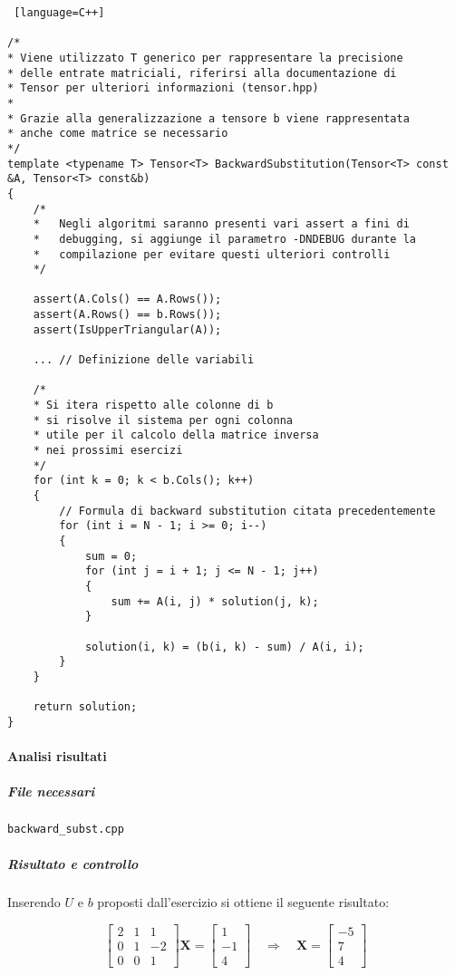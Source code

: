 \begin{lstlisting} [language=C++]

/*
* Viene utilizzato T generico per rappresentare la precisione 
* delle entrate matriciali, riferirsi alla documentazione di 
* Tensor per ulteriori informazioni (tensor.hpp)
*
* Grazie alla generalizzazione a tensore b viene rappresentata 
* anche come matrice se necessario
*/
template <typename T> Tensor<T> BackwardSubstitution(Tensor<T> const &A, Tensor<T> const&b)
{
    /*
    *   Negli algoritmi saranno presenti vari assert a fini di 
    *   debugging, si aggiunge il parametro -DNDEBUG durante la 
    *   compilazione per evitare questi ulteriori controlli
    */

    assert(A.Cols() == A.Rows());
    assert(A.Rows() == b.Rows());
    assert(IsUpperTriangular(A));

    ... // Definizione delle variabili

    /* 
    * Si itera rispetto alle colonne di b 
    * si risolve il sistema per ogni colonna
    * utile per il calcolo della matrice inversa
    * nei prossimi esercizi
    */
    for (int k = 0; k < b.Cols(); k++)
    {
        // Formula di backward substitution citata precedentemente
        for (int i = N - 1; i >= 0; i--)
        {
            sum = 0;
            for (int j = i + 1; j <= N - 1; j++)
            {
                sum += A(i, j) * solution(j, k);
            }

            solution(i, k) = (b(i, k) - sum) / A(i, i);
        }
    }

    return solution;
}

\end{lstlisting}

\paragraph{Analisi risultati}

\subparagraph{File necessari} \texttt{backward\_subst.cpp}

\subparagraph{Risultato e controllo}

Inserendo $U$ e $b$ proposti dall'esercizio si ottiene il seguente risultato:

$$
	\begin{bmatrix}
		2 & 1 & 1  \\
		0 & 1 & -2 \\
		0 & 0 & 1
	\end{bmatrix} \mathbf{X} = \begin{bmatrix}
		1 \\ -1 \\ 4 \end{bmatrix}
	\quad \Rightarrow \quad \mathbf{X} = \begin{bmatrix} -5 \\ 7 \\ 4 \end{bmatrix}
$$


